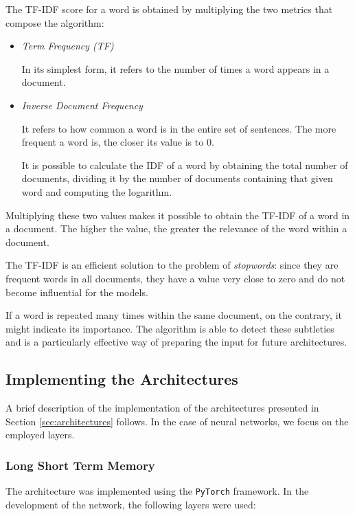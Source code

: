 \documentclass[letterpaper,11pt]{article}
\begin{document}
The TF-IDF score for a word is obtained by multiplying the two metrics that compose the algorithm:

\begin{itemize}
  \item \textit{Term Frequency (TF)}
  
  In its simplest form, it refers to the number of times a word appears in a document.

  \item \textit{Inverse Document Frequency}
  
  It refers to how common a word is in the entire set of sentences. The more frequent a word is, the closer its value is to 0.

  It is possible to calculate the IDF of a word by obtaining the total number of documents, dividing it by the number of documents containing that given word and computing the logarithm.
\end{itemize}

Multiplying these two values makes it possible to obtain the TF-IDF of a word in a document. The higher the value, the greater the relevance of the word within a document.

The TF-IDF is an efficient solution to the problem of \textit{stopwords}: since they are frequent words in all documents, they have a value very close to zero and do not become influential for the models.

If a word is repeated many times within the same document, on the contrary, it might indicate its importance. The algorithm is able to detect these subtleties and is a particularly effective way of preparing the input for future architectures.


\subsection{Implementing the Architectures}
\label{subsec:implementation}

A brief description of the implementation of the architectures presented in Section \ref{sec:architectures} follows. In the case of neural networks, we focus on the employed layers.

\subsubsection*{Long Short Term Memory}

The architecture was implemented using the \verb|PyTorch| framework. 
In the development of the network, the following layers were used:
\end{document}
